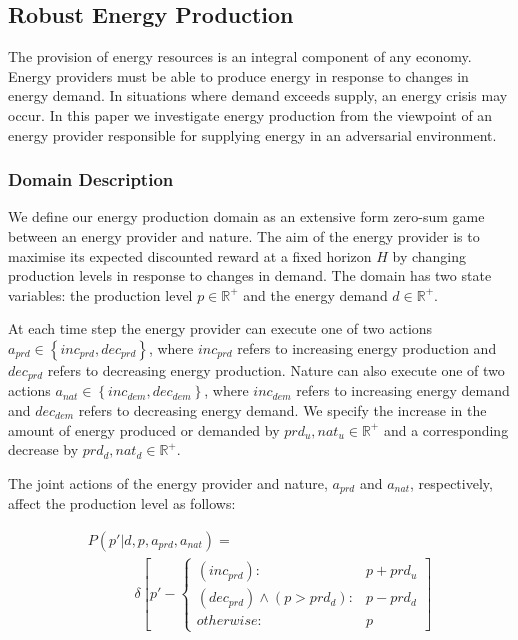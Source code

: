 \subsection{Robust Energy Production}

The provision of energy resources is an integral component of any
economy. Energy providers must be able to produce energy in response
to changes in energy demand. In situations where demand exceeds supply,
an energy crisis may occur. In this paper we investigate energy 
production from the viewpoint of an energy provider responsible for 
supplying energy in an adversarial environment.

\subsubsection{Domain Description}

We define our energy production domain as an extensive form zero-sum
game between an energy provider and nature. The aim of the energy
provider is to maximise its expected discounted reward at a 
fixed horizon $H$ by changing production levels in response to changes in demand.
The domain has two state variables: the production level $p \in \mathbb{R}^{+}$ and the energy demand
$d \in \mathbb{R}^{+}$. 

At each time step the energy provider can execute one of two actions
$a_{prd} \in \left\{inc_{prd}, dec_{prd}\right\}$, where $inc_{prd}$ 
refers to increasing energy production and $dec_{prd}$ refers to decreasing
energy production. Nature can also execute one of two actions
$a_{nat} \in \left\{inc_{dem}, dec_{dem}\right\}$, where $inc_{dem}$ 
refers to increasing energy demand and $dec_{dem}$ refers to decreasing
energy demand. We specify the increase in the 
amount of energy produced or demanded by $prd_{u}, nat_{u} \in \mathbb{R}^{+}$ and a
corresponding decrease by $prd_{d}, nat_{d} \in \mathbb{R}^{+}$.

The joint actions of the energy provider and nature, $a_{prd}$ and
$a_{nat}$, respectively, affect the production level as follows:

{\small 
\abovedisplayskip=0pt
\belowdisplayskip=0pt
\begin{align*}
&P(p' | d, p, a_{prd}, a_{nat}) = \\
& \hspace{40pt} \delta \left[ p' - \begin{cases}
      (inc_{prd})  : & p + prd_{u} \\
       (dec_{prd}) \wedge (p > prd_{d}): & p - prd_{d} \\
      otherwise: & p
    \end{cases} \right] & \\    
\end{align*}
}%

